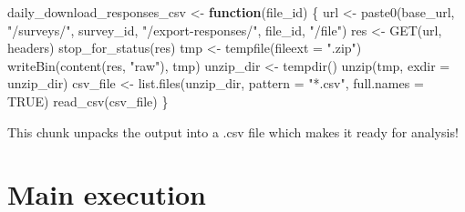 \documentclass[
  english,
  letterpaper,
  DIV=11,
  numbers=noendperiod]{scrreprt}
\newenvironment{Shaded}{\begin{snugshade}}{\end{snugshade}}
\newcommand{\AttributeTok}[1]{\textcolor[rgb]{0.40,0.45,0.13}{#1}}
\newcommand{\ConstantTok}[1]{\textcolor[rgb]{0.56,0.35,0.01}{#1}}
\newcommand{\ControlFlowTok}[1]{\textcolor[rgb]{0.00,0.23,0.31}{\textbf{#1}}}
\newcommand{\FunctionTok}[1]{\textcolor[rgb]{0.28,0.35,0.67}{#1}}
\newcommand{\NormalTok}[1]{\textcolor[rgb]{0.00,0.23,0.31}{#1}}
\newcommand{\OtherTok}[1]{\textcolor[rgb]{0.00,0.23,0.31}{#1}}
\newcommand{\SpecialCharTok}[1]{\textcolor[rgb]{0.37,0.37,0.37}{#1}}
\newcommand{\StringTok}[1]{\textcolor[rgb]{0.13,0.47,0.30}{#1}}
\begin{document}
\begin{Shaded}
\begin{Highlighting}[]
\NormalTok{daily\_download\_responses\_csv }\OtherTok{\textless{}{-}} \ControlFlowTok{function}\NormalTok{(file\_id) \{}
\NormalTok{  url }\OtherTok{\textless{}{-}} \FunctionTok{paste0}\NormalTok{(base\_url, }\StringTok{"/surveys/"}\NormalTok{, survey\_id, }\StringTok{"/export{-}responses/"}\NormalTok{, file\_id, }\StringTok{"/file"}\NormalTok{)}
\NormalTok{  res }\OtherTok{\textless{}{-}} \FunctionTok{GET}\NormalTok{(url, headers)}
  \FunctionTok{stop\_for\_status}\NormalTok{(res)}
\NormalTok{  tmp }\OtherTok{\textless{}{-}} \FunctionTok{tempfile}\NormalTok{(}\AttributeTok{fileext =} \StringTok{".zip"}\NormalTok{)}
  \FunctionTok{writeBin}\NormalTok{(}\FunctionTok{content}\NormalTok{(res, }\StringTok{"raw"}\NormalTok{), tmp)}
\NormalTok{  unzip\_dir }\OtherTok{\textless{}{-}} \FunctionTok{tempdir}\NormalTok{()}
  \FunctionTok{unzip}\NormalTok{(tmp, }\AttributeTok{exdir =}\NormalTok{ unzip\_dir)}
\NormalTok{  csv\_file }\OtherTok{\textless{}{-}} \FunctionTok{list.files}\NormalTok{(unzip\_dir, }\AttributeTok{pattern =} \StringTok{"*.csv"}\NormalTok{, }\AttributeTok{full.names =} \ConstantTok{TRUE}\NormalTok{)}
  \FunctionTok{read\_csv}\NormalTok{(csv\_file)}
\NormalTok{\}}
\end{Highlighting}
\end{Shaded}

This chunk unpacks the output into a .csv file which makes it ready for
analysis!

\section{Main execution}\label{main-execution}

\begin{Shaded}
\end{Shaded}
\end{document}
